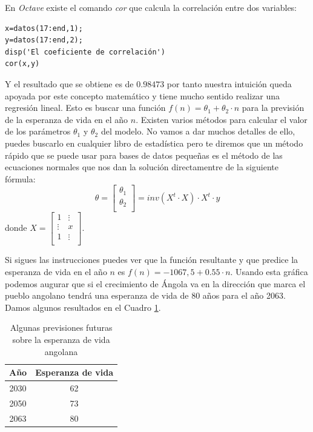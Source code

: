 En \emph{Octave} existe el comando \emph{cor} que calcula la
correlación entre dos variables:
\begin{octavebox}
  \begin{verbatim}
x=datos(17:end,1);
y=datos(17:end,2);
disp('El coeficiente de correlación')
cor(x,y)
\end{verbatim}
\end{octavebox}
Y el resultado que se obtiene es de $0.98473$ por tanto nuestra
intuición queda apoyada por este concepto matemático y tiene mucho
sentido realizar una regresión lineal. Esto es buscar una función
$f(n)=\theta_1+\theta_2 \cdot n$ para la previsión de la esperanza de
vida en el año $n$.  Existen varios métodos para calcular el valor de
los parámetros $\theta_1$ y $\theta_2$ del modelo. No vamos a dar
muchos detalles de ello, puedes buscarlo en cualquier libro de
estadística pero te diremos que un método rápido que se puede usar
para bases de datos pequeñas es el método de las ecuaciones normales
que nos dan la solución directamentre de la siguiente fórmula:
\begin{equation}
\theta=\left[
\begin{array}{c}
\theta_1\\
\theta_2\\
\end{array}
\right]=inv(X^t \cdot X)\cdot X^t \cdot y
\end{equation}
donde $X=\left[
\begin{array}{cc}
1 & \vdots\\
\vdots & x\\
1 & \vdots\\
\end{array}
\right]$.

Si sigues las instrucciones puedes ver que la función resultante y que
predice la esperanza de vida en el año $n$ es $f(n)=-1067,5+0.55 \cdot n$.  Usando esta
gráfica podemos augurar que si el crecimiento de Ángola va en la
dirección que marca el pueblo angolano tendrá una esperanza de vida de
80 años para el año 2063.  Damos algunos resultados en el Cuadro \ref{resultados}.
\begin{table}
\begin{center}
\begin{tabular}{cc}
\hline
Año & Esperanza de vida\\
\hline
2030 & 62\\
2050 & 73\\
2063 & 80\\
\hline
\end{tabular}
\end{center}\caption{Algunas previsiones futuras sobre la esperanza de vida angolana}\label{resultados}
\end{table}

